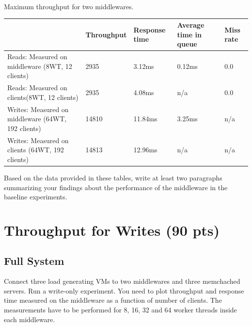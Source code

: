 \documentclass[11pt,a4paper]{article}
\begin{document}
\begin{center}
	{Maximum throughput for two middlewares.}
	\begin{tabular}{|l|p{2cm}|p{2cm}|p{2cm}|p{2cm}|}
		\hline                                                    & Throughput     & Response time & Average time in queue & Miss rate \\ 
		\hline Reads: Measured on middleware (8WT, 12 clients)    &    2935        &   3.12ms      &   0.12ms              & 0.0       \\ 
		\hline Reads: Measured on clients(8WT, 12 clients)        &    2935        &   4.08ms      & n/a                   & 0.0       \\ 
		\hline Writes: Measured on middleware (64WT, 192 clients) &    14810       &   11.84ms     &   3.25ms              & n/a       \\ 
		\hline Writes: Measured on clients (64WT, 192 clients)    &    14813       &   12.96ms     & n/a                   & n/a       \\ 
		\hline 
	\end{tabular}
\end{center}

Based on the data provided in these tables, write at least two paragraphs summarizing your findings about the performance of the middleware in the baseline experiments.

\section{Throughput for Writes (90 pts)}

\subsection{Full System} \label{sec4}

Connect three load generating VMs to two middlewares and three memchached servers. Run a write-only experiment. 
You need to plot throughput and response time measured on the middleware as a function of number of clients. The measurements have to be performed for 8, 16, 32 and 64 worker threads inside each middleware.
\end{document}
